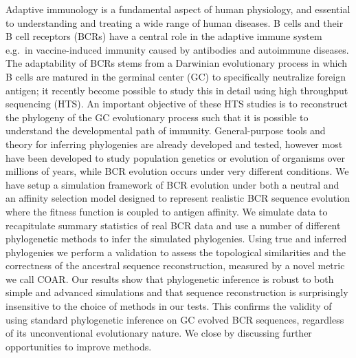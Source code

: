 Adaptive immunology is a fundamental aspect of human physiology, and essential to understanding and treating a wide range of human diseases.
B cells and their B cell receptors (BCRs) have a central role in the adaptive immune system e.g.\ in vaccine-induced immunity caused by antibodies and autoimmune diseases.
The adaptability of BCRs stems from a Darwinian evolutionary process in which B cells are matured in the germinal center (GC) to specifically neutralize foreign antigen; it recently become possible to study this in detail using high throughput sequencing (HTS).
An important objective of these HTS studies is to reconstruct the phylogeny of the GC evolutionary process such that it is possible to understand the developmental path of immunity.
General-purpose tools and theory for inferring phylogenies are already developed and tested, however most have been developed to study population genetics or evolution of organisms over millions of years, while BCR evolution occurs under very different conditions.
We have setup a simulation framework of BCR evolution under both a neutral and an affinity selection model designed to represent realistic BCR sequence evolution where the fitness function is coupled to antigen affinity.
We simulate data to recapitulate summary statistics of real BCR data and use a number of different phylogenetic methods to infer the simulated phylogenies.
Using true and inferred phylogenies we perform a validation to assess the topological similarities and the correctness of the ancestral sequence reconstruction, measured by a novel metric we call COAR.
Our results show that phylogenetic inference is robust to both simple and advanced simulations and that sequence reconstruction is surprisingly insensitive to the choice of methods in our tests.
This confirms the validity of using standard phylogenetic inference on GC evolved BCR sequences, regardless of its unconventional evolutionary nature.
We close by discussing further opportunities to improve methods.
